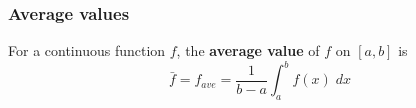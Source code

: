 


\begin{frame}
\frametitle{Average values}

\begin{definition}
For a continuous function $f$, the \textbf{average value } of $f$ on $[a,b]$ is \[\bar{f}= f_{ave}=\dfrac{1}{b-a}\int_a^b f(x)\;dx\]
\end{definition}


\end{frame}

